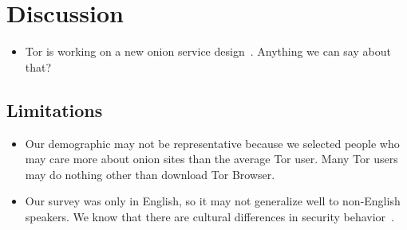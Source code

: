 \section{Discussion}
\label{sec:discussion}

\begin{itemize}
    \item Tor is working on a new onion service design~\cite{Mathewson2013a}.
        Anything we can say about that?
\end{itemize}

\subsection{Limitations}
\begin{itemize}
    \item Our demographic may not be representative because we selected people
        who may care more about onion sites than the average Tor user.  Many
        Tor users may do nothing other than download Tor Browser.
    \item Our survey was only in English, so it may not generalize well to
        non-English speakers.  We know that there are cultural differences in
        security behavior~\cite{Sawaya2017a}.
\end{itemize}
